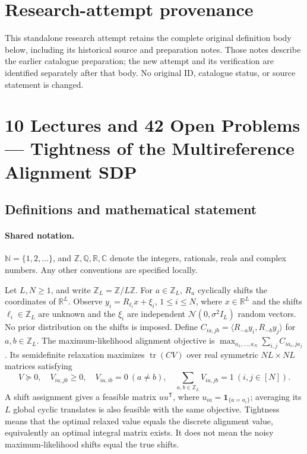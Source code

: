\documentclass[11pt]{article}
\begin{document}
\section*{Research-attempt provenance}
This standalone research attempt retains the complete original definition body below,
including its historical source and preparation notes. Those notes describe the
earlier catalogue preparation; the new attempt and its verification are identified
separately after that body. No original ID, catalogue status, or source statement is changed.

\section{10 Lectures and 42 Open Problems — Tightness of the Multireference Alignment SDP}\label{statement}

\subsection{Definitions and mathematical statement}

\paragraph{Shared notation.}$\mathbb N=\{1,2,\ldots\}$, and $\mathbb Z,\mathbb Q,\mathbb R,\mathbb C$ denote the integers, rationals, reals and complex numbers. Any other conventions are specified locally.


Let $L,N\ge1$, and write $\mathbb Z_L=\mathbb Z/L\mathbb Z$. For $a\in\mathbb Z_L$, $R_a$ cyclically shifts the coordinates of $\mathbb R^L$. Observe $y_i=R_{\ell_i}x+\xi_i$, $1\le i\le N$, where $x\in\mathbb R^L$ and the shifts $\ell_i\in\mathbb Z_L$ are unknown and the $\xi_i$ are independent $\mathcal N(0,\sigma^2 I_L)$ random vectors. No prior distribution on the shifts is imposed. Define $C_{ia,jb}=\langle R_{-a}y_i,R_{-b}y_j\rangle$ for $a,b\in\mathbb Z_L$. The maximum-likelihood alignment objective is $\max_{a_1,\ldots,a_N}\sum_{i,j}C_{ia_i,ja_j}$. Its semidefinite relaxation maximizes $\operatorname{tr}(CV)$ over real symmetric $NL\times NL$ matrices satisfying \[V\succeq0,\quad V_{ia,jb}\ge0,\quad V_{ia,ib}=0\ (a\ne b),\quad \sum_{a,b\in\mathbb Z_L}V_{ia,jb}=1\ (i,j\in[N]).\] A shift assignment gives a feasible matrix $u u^\mathsf T$, where $u_{ia}=\mathbf1_{\{a=a_i\}}$; averaging its $L$ global cyclic translates is also feasible with the same objective. Tightness means that the optimal relaxed value equals the discrete alignment value, equivalently an optimal integral matrix exists. It does not mean the noisy maximum-likelihood shifts equal the true shifts.
\end{document}
